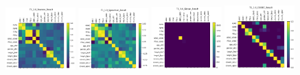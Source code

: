 \begin{figure}
    \centering
    \includegraphics[width=0.24\textwidth]{diss/7_cond/figs/T1_1.0_Pearson_Result.png}
    \includegraphics[width=0.24\textwidth]{diss/7_cond/figs/T1_1.0_Spearman_Result.png}
    \includegraphics[width=0.24\textwidth]{diss/7_cond/figs/T1_1.0_Glasso_Result.png}
    \includegraphics[width=0.24\textwidth]{diss/7_cond/figs/T1_1.0_CODEC_Result.png}
    

\end{figure}
